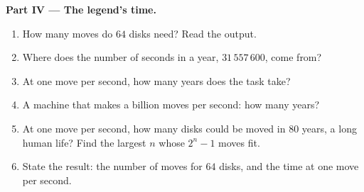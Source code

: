 \begin{problem}
\medskip\noindent\textbf{Part IV --- The legend's time.}
\begin{enumerate}[resume]
  \item How many moves do $64$ disks need? Read the output.
  \item Where does the number of seconds in a year, $31\,557\,600$, come from?
  \item At one move per second, how many years does the task take?
  \item A machine that makes a billion moves per second: how many years?
  \item At one move per second, how many disks could be moved in $80$ years, a long human life? Find the largest
    $n$ whose $2^n - 1$ moves fit.
  \item State the result: the number of moves for $64$ disks, and the time at one move per second.
\end{enumerate}
\end{problem}
